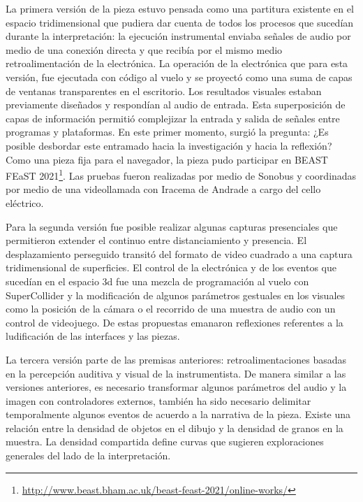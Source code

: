 \documentclass[12pt,letterpaper, twoside, openright,
headinclude,footinclude,BCOR5mm,
numbers=noenddot,cleardoublepage=empty,
tablecaptionabove]{article}
\begin{document}


La primera versión de la pieza estuvo pensada como una partitura existente en el espacio tridimensional que pudiera dar cuenta de todos los procesos que sucedían durante la interpretación: la ejecución instrumental  enviaba señales de audio por medio de una conexión directa y que recibía por el mismo medio retroalimentación de la electrónica. La operación de la electrónica que para esta versión, fue ejecutada con código al vuelo y se proyectó como una suma de capas de ventanas transparentes en el escritorio. Los resultados visuales estaban previamente diseñados y respondían al audio de entrada. Esta superposición de capas de información permitió complejizar la entrada y salida de señales entre programas y plataformas. En este primer momento, surgió la pregunta: ¿Es posible desbordar este entramado hacia la investigación y hacia la reflexión? Como una pieza fija para el navegador, la pieza pudo participar en BEAST FEaST 2021\footnote{\url{http://www.beast.bham.ac.uk/beast-feast-2021/online-works/}}. Las pruebas fueron realizadas por medio de Sonobus y coordinadas por medio de una videollamada con Iracema de Andrade a cargo del cello eléctrico. 




Para la segunda versión fue posible realizar algunas capturas presenciales que permitieron extender el continuo entre distanciamiento y presencia. El desplazamiento perseguido transitó del formato de video cuadrado a una captura tridimensional de superficies. El control de la electrónica y de los eventos que sucedían en el espacio 3d fue una mezcla de programación al vuelo con SuperCollider y la modificación de algunos parámetros gestuales en los visuales como la posición de la cámara o el recorrido de una muestra de audio con un control de videojuego. De estas propuestas emanaron reflexiones referentes a la ludificación de las interfaces y las piezas. 


La tercera versión parte de las premisas anteriores: retroalimentaciones basadas en la percepción auditiva y visual de la instrumentista. De manera similar a las versiones anteriores, es necesario transformar algunos parámetros del audio y la imagen con controladores externos, también ha sido necesario delimitar temporalmente algunos eventos de acuerdo a la narrativa de la pieza. Existe una relación entre la densidad de objetos en el dibujo y la densidad de granos en la muestra.  La densidad compartida define curvas que sugieren exploraciones generales del lado de la interpretación.
\end{document}
